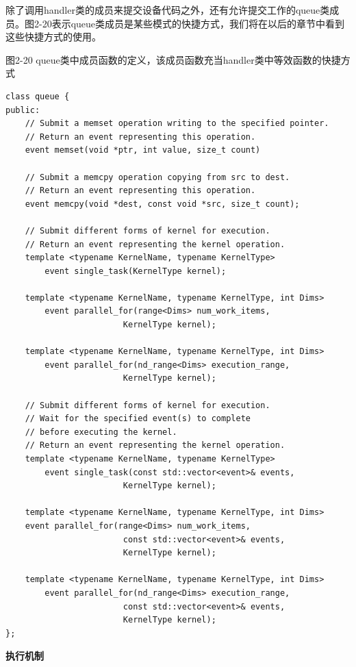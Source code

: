 除了调用handler类的成员来提交设备代码之外，还有允许提交工作的queue类成员。图2-20表示queue类成员是某些模式的快捷方式，我们将在以后的章节中看到这些快捷方式的使用。\par

\hspace*{\fill} \par %
图2-20 queue类中成员函数的定义，该成员函数充当handler类中等效函数的快捷方式
\begin{lstlisting}[caption={}]
class queue {
public:
	// Submit a memset operation writing to the specified pointer.
	// Return an event representing this operation.
	event memset(void *ptr, int value, size_t count)
	
	// Submit a memcpy operation copying from src to dest.
	// Return an event representing this operation.
	event memcpy(void *dest, const void *src, size_t count);
	
	// Submit different forms of kernel for execution.
	// Return an event representing the kernel operation.
	template <typename KernelName, typename KernelType>
		event single_task(KernelType kernel);
		
	template <typename KernelName, typename KernelType, int Dims>
		event parallel_for(range<Dims> num_work_items, 
						KernelType kernel); 
						
	template <typename KernelName, typename KernelType, int Dims>
		event parallel_for(nd_range<Dims> execution_range, 
						KernelType kernel); 
						
	// Submit different forms of kernel for execution. 
	// Wait for the specified event(s) to complete 
	// before executing the kernel. 
	// Return an event representing the kernel operation.
	template <typename KernelName, typename KernelType>
		event single_task(const std::vector<event>& events, 
						KernelType kernel);
						
	template <typename KernelName, typename KernelType, int Dims>
	event parallel_for(range<Dims> num_work_items, 
						const std::vector<event>& events, 
						KernelType kernel);
	
	template <typename KernelName, typename KernelType, int Dims>
		event parallel_for(nd_range<Dims> execution_range, 
						const std::vector<event>& events, 
						KernelType kernel);
};
\end{lstlisting}

\hspace*{\fill} \par %
\textbf{执行机制}

